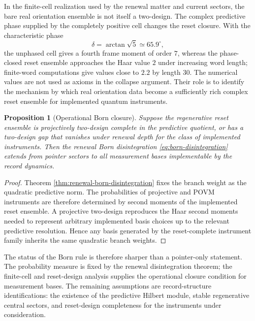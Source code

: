 \documentclass[11pt]{article}
\numberwithin{equation}{section}
\newtheorem{proposition}[theorem]{Proposition}
\theoremstyle{definition}
\theoremstyle{remark}
\begin{document}
In the finite-cell realization used by the renewal matter and current sectors, the bare real orientation ensemble is not itself a two-design.  The complex predictive phase supplied by the completely positive cell changes the reset closure.  With the characteristic phase
\begin{equation}
\label{eq:cp-phase}
  \delta=\arctan\sqrt5\simeq 65.9^\circ,
\end{equation}
the unphased cell gives a fourth frame moment of order \(7\), whereas the phase-closed reset ensemble approaches the Haar value \(2\) under increasing word length; finite-word computations give values close to \(2.2\) by length \(30\).  The numerical values are not used as axioms in the collapse argument.  Their role is to identify the mechanism by which real orientation data become a sufficiently rich complex reset ensemble for implemented quantum instruments.

\begin{proposition}[Operational Born closure]
\label{prop:operational-born-closure}
Suppose the regenerative reset ensemble is projectively two-design complete in the predictive quotient, or has a two-design gap that vanishes under renewal depth for the class of implemented instruments.  Then the renewal Born disintegration \eqref{eq:born-disintegration} extends from pointer sectors to all measurement bases implementable by the record dynamics.
\end{proposition}

\begin{proof}
Theorem \ref{thm:renewal-born-disintegration} fixes the branch weight as the quadratic predictive norm.  The probabilities of projective and POVM instruments are therefore determined by second moments of the implemented reset ensemble.  A projective two-design reproduces the Haar second moments needed to represent arbitrary implemented basis choices up to the relevant predictive resolution.  Hence any basis generated by the reset-complete instrument family inherits the same quadratic branch weights.
\end{proof}

The status of the Born rule is therefore sharper than a pointer-only statement.  The probability measure is fixed by the renewal disintegration theorem; the finite-cell and reset-design analysis supplies the operational closure condition for measurement bases.  The remaining assumptions are record-structure identifications: the existence of the predictive Hilbert module, stable regenerative central sectors, and reset-design completeness for the instruments under consideration.
\end{document}
